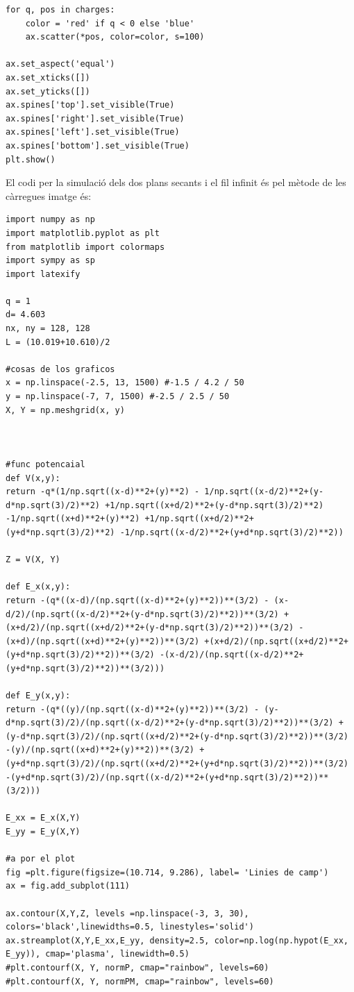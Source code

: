 \documentclass[a4paper,10.5pt]{report}
\begin{document}
\begin{appendices}
\begin{lstlisting}
for q, pos in charges:
    color = 'red' if q < 0 else 'blue'
    ax.scatter(*pos, color=color, s=100)

ax.set_aspect('equal')
ax.set_xticks([])
ax.set_yticks([])
ax.spines['top'].set_visible(True)
ax.spines['right'].set_visible(True)
ax.spines['left'].set_visible(True)
ax.spines['bottom'].set_visible(True)
plt.show()
\end{lstlisting}

El codi per la simulació dels dos plans secants i el fil infinit és pel mètode de les càrregues imatge és:
\begin{lstlisting}
import numpy as np
import matplotlib.pyplot as plt
from matplotlib import colormaps
import sympy as sp
import latexify

q = 1
d= 4.603
nx, ny = 128, 128
L = (10.019+10.610)/2

#cosas de los graficos
x = np.linspace(-2.5, 13, 1500) #-1.5 / 4.2 / 50
y = np.linspace(-7, 7, 1500) #-2.5 / 2.5 / 50
X, Y = np.meshgrid(x, y)



#func potencaial
def V(x,y):
return -q*(1/np.sqrt((x-d)**2+(y)**2) - 1/np.sqrt((x-d/2)**2+(y-d*np.sqrt(3)/2)**2) +1/np.sqrt((x+d/2)**2+(y-d*np.sqrt(3)/2)**2) -1/np.sqrt((x+d)**2+(y)**2) +1/np.sqrt((x+d/2)**2+(y+d*np.sqrt(3)/2)**2) -1/np.sqrt((x-d/2)**2+(y+d*np.sqrt(3)/2)**2))

Z = V(X, Y)

def E_x(x,y):
return -(q*((x-d)/(np.sqrt((x-d)**2+(y)**2))**(3/2) - (x-d/2)/(np.sqrt((x-d/2)**2+(y-d*np.sqrt(3)/2)**2))**(3/2) +(x+d/2)/(np.sqrt((x+d/2)**2+(y-d*np.sqrt(3)/2)**2))**(3/2) -(x+d)/(np.sqrt((x+d)**2+(y)**2))**(3/2) +(x+d/2)/(np.sqrt((x+d/2)**2+(y+d*np.sqrt(3)/2)**2))**(3/2) -(x-d/2)/(np.sqrt((x-d/2)**2+(y+d*np.sqrt(3)/2)**2))**(3/2)))

def E_y(x,y):
return -(q*((y)/(np.sqrt((x-d)**2+(y)**2))**(3/2) - (y-d*np.sqrt(3)/2)/(np.sqrt((x-d/2)**2+(y-d*np.sqrt(3)/2)**2))**(3/2) +(y-d*np.sqrt(3)/2)/(np.sqrt((x+d/2)**2+(y-d*np.sqrt(3)/2)**2))**(3/2) -(y)/(np.sqrt((x+d)**2+(y)**2))**(3/2) +(y+d*np.sqrt(3)/2)/(np.sqrt((x+d/2)**2+(y+d*np.sqrt(3)/2)**2))**(3/2) -(y+d*np.sqrt(3)/2)/(np.sqrt((x-d/2)**2+(y+d*np.sqrt(3)/2)**2))**(3/2)))

E_xx = E_x(X,Y)
E_yy = E_y(X,Y)

#a por el plot
fig =plt.figure(figsize=(10.714, 9.286), label= 'Linies de camp') 
ax = fig.add_subplot(111)

ax.contour(X,Y,Z, levels =np.linspace(-3, 3, 30), colors='black',linewidths=0.5, linestyles='solid')
ax.streamplot(X,Y,E_xx,E_yy, density=2.5, color=np.log(np.hypot(E_xx, E_yy)), cmap='plasma', linewidth=0.5)
#plt.contourf(X, Y, normP, cmap="rainbow", levels=60)
#plt.contourf(X, Y, normPM, cmap="rainbow", levels=60)



\end{lstlisting}
\end{appendices}
\end{document}
